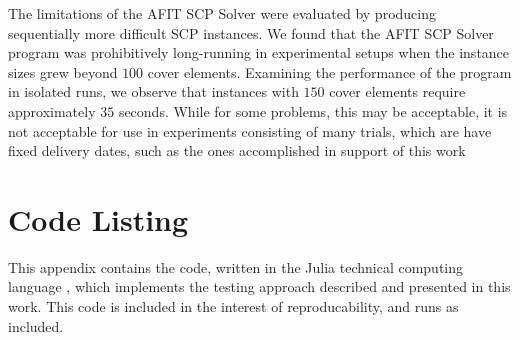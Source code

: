 \documentclass[12pt]{article}
\begin{document}
The limitations of the AFIT SCP Solver were evaluated by producing sequentially more difficult SCP instances. We found that the AFIT SCP Solver program was prohibitively long-running in experimental setups when the instance sizes grew beyond $100$ cover elements. Examining the performance of the program in isolated runs, we observe that instances with $150$ cover elements require approximately $35$ seconds. While for some problems, this may be acceptable, it is not acceptable for use in experiments consisting of many trials, which are have fixed delivery dates, such as the ones accomplished in support of this work


\pagebreak
\appendix		%
	
\section{Code Listing}

This appendix contains the code, written in the Julia technical computing language \cite{Julia}, which implements the testing approach described and presented in this work. This code is included in the interest of reproducability, and runs as included.


	


\end{document}

